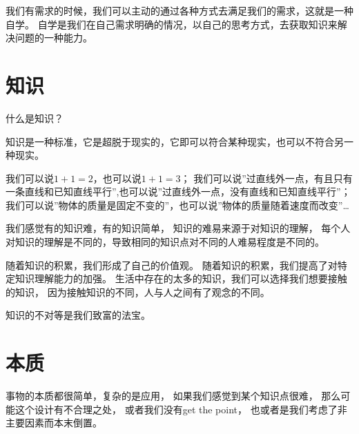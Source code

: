 我们有需求的时候，我们可以主动的通过各种方式去满足我们的需求，这就是一种自学。
自学是我们在自己需求明确的情况，以自己的思考方式，去获取知识来解决问题的一种能力。







\section{知识}
什么是知识？

知识是一种标准，它是超脱于现实的，它即可以符合某种现实，也可以不符合另一种现实。

我们可以说$1+1=2$，也可以说$1+1=3$；
我们可以说''过直线外一点，有且只有一条直线和已知直线平行'',也可以说''过直线外一点，没有直线和已知直线平行''；
我们可以说''物体的质量是固定不变的''，也可以说''物体的质量随着速度而改变''\dots



我们感觉有的知识难，有的知识简单，
知识的难易来源于对知识的理解，
每个人对知识的理解是不同的，导致相同的知识点对不同的人难易程度是不同的。

随着知识的积累，我们形成了自己的价值观。
随着知识的积累，我们提高了对特定知识理解能力的加强。
生活中存在的太多的知识，我们可以选择我们想要接触的知识，
因为接触知识的不同，人与人之间有了观念的不同。

知识的不对等是我们致富的法宝。


\section{本质}

事物的本质都很简单，复杂的是应用，
如果我们感觉到某个知识点很难，
那么可能这个设计有不合理之处，
或者我们没有get the point，
也或者是我们考虑了非主要因素而本末倒置。




